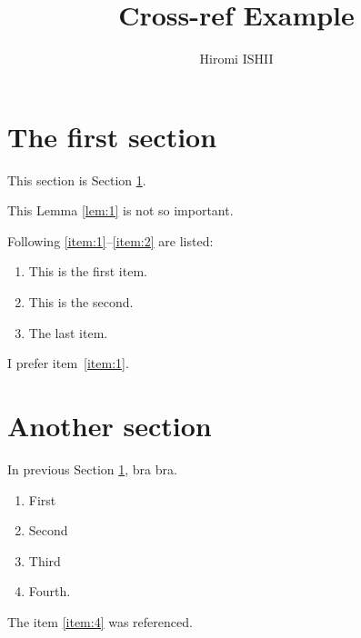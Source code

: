 \documentclass[a4paper]{article}
\title{Cross-ref Example}
\author{Hiromi ISHII}
\begin{document}
\maketitle

\section{The first section}\label{sec:first-section}

This section is Section \ref{sec:first-section}.

\begin{lemma}\label{lem:1}
 This Lemma \ref{lem:1} is not so important.
\end{lemma}

Following \ref{item:1}--\ref{item:2} are listed:
\begin{enumerate}
 \item \label{item:1} This is the first item.
 \item This is the second.
 \item \label{item:2} The last item.
\end{enumerate}

I prefer item~\ref{item:1}.

\section{Another section}

In previous Section \ref{sec:first-section}, bra bra.

\begin{enumerate}
 \item First
 \item Second\label{item:4}
 \item Third
 \item Fourth.
\end{enumerate}

The item \ref{item:4} was referenced.
\end{document}
